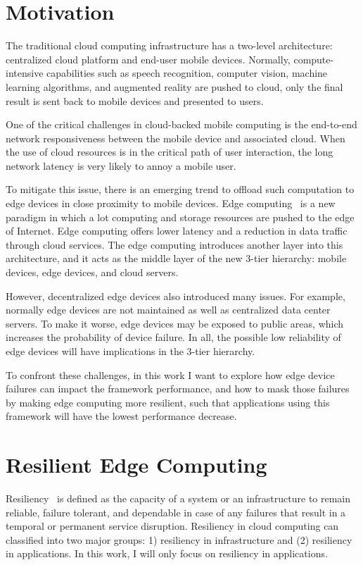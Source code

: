 \section{Motivation}
The traditional cloud computing infrastructure has a two-level
architecture: centralized cloud platform and end-user mobile devices.
Normally, compute-intensive capabilities such as speech recognition,
computer vision, machine learning algorithms, and augmented reality
are pushed to cloud, only the final result is sent back to mobile
devices and presented to users.

One of the critical challenges in cloud-backed mobile computing
is the end-to-end network responsiveness between the mobile device
and associated cloud. When the use of cloud resources is in the
critical path of user interaction, the long network latency is very
likely to annoy a mobile user.

To mitigate this issue, there is an emerging trend to offload
such computation to edge devices in close proximity to mobile devices.
Edge computing~\cite{url:openedgecomputing,edge-computing} is a new paradigm in which a lot computing and storage
resources are pushed to the edge of Internet. Edge computing offers
lower latency and a reduction in data traffic through cloud services.
The edge computing introduces another layer into this architecture, and it acts as the
middle layer of the new 3-tier hierarchy: mobile devices, edge devices,
and cloud servers.

However, decentralized edge devices also introduced many issues.
For example, normally edge devices are not maintained as well
as centralized data center servers. To make it worse, edge devices
may be exposed to public areas, which increases the probability
of device failure. In all, the possible low reliability of edge
devices will have implications in the 3-tier hierarchy.

To confront these challenges, in this work I want to explore
how edge device failures can impact the framework performance,
and how to mask those failures by making edge computing more resilient,
such that applications using this framework will have the lowest performance decrease.

\section{Resilient Edge Computing}
Resiliency~\cite{Resiliency-survey} is defined as the capacity of
a system or an infrastructure to remain reliable, failure tolerant, and dependable
in case of any failures that result in a temporal or permanent service disruption.
Resiliency in cloud computing can classified into two major groups: 1) resiliency in
infrastructure and (2) resiliency in applications. In this work, I will only focus
on resiliency in applications.

